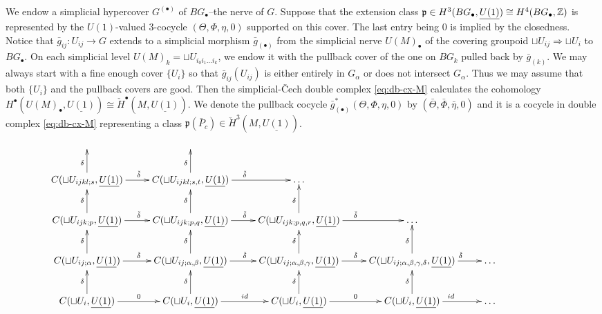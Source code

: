 \documentclass[letterpaper,10pt, oneside]{article} %
\newcommand{\frkp}{\mathfrak p}
\newcommand{\pp}{\frkp} %
\newcommand{\bg}{\bar{g}}
\newcommand{\bPhi}{\bar{\Phi}}
\newcommand{\bareta}{\bar{\eta}}
\newcommand{\bTheta}{\bar{\Theta}}
\begin{document}
We endow a simplicial hypercover $G^{(\bullet)}$ of $BG_\bullet$--the nerve of
$G$. Suppose that the extension class $\pp \in H^3(BG_\bullet, \underline{U(1)})\cong
H^4(BG_\bullet, \Z)$ is represented by  the $U(1)$-valued 3-cocycle $(\Theta,
\Phi, \eta, 0)$ supported on this cover. The last entry being $0$ is
implied by the closedness.
Notice that $\bg_{ij}: U_{ij} \to G $ extends to a simplicial morphism $\bg_{(\bullet)}$
from the simplicial nerve $U(M)_\bullet$ of the covering groupoid
$\sqcup U_{ij} \Rightarrow \sqcup U_i$ to
$BG_\bullet$. On each simplicial level $U(M)_k=\sqcup
U_{i_0 i_1\dots i_k} $, we endow it with the pullback cover of the one on
$BG_k$ pulled back by $\bg_{(k)}$. We may always start with a fine enough cover $\{U_i\}$ so that $\bar{g}_{ij}(U_{ij})$ is either entirely in $G_\alpha$ or does not intersect $G_\alpha$. Thus we may assume that both $\{U_i\}$ and the pullback covers are good. Then the
simplicial-\v{C}ech double complex \eqref{eq:db-cx-M} calculates the cohomology $H^\bullet(U(M)_\bullet, \underline{U(1)})\cong \check{H}^\bullet(M, \underline{U(1)})$. We denote the pullback cocycle $\bg_{(\bullet)}^*(\Theta, \Phi, \eta, 0)$ by
$(\bTheta, \bPhi, \bareta, 0)$ and it is a cocycle in double complex \eqref{eq:db-cx-M} representing a class $\pp(\bar{P}_c)\in \check{H}^3(M, \underline{U(1)})$.
\begin{equation}\label{eq:db-cx-M}
\xymatrix{
 &&&&&&\\
 C(\sqcup U_{ijkl;s},\underline{U(1)})\ar[r]^{\check{\delta}}\ar[u]^{\delta}
 &C(\sqcup U_{ijkl;s,t},\underline{U(1)})\ar[r]^{\check{\delta}}\ar[u]^{\delta}
 &\dots %
&%
&%
&
 \\
  C(\sqcup U_{ijk;p},\underline{U(1)})\ar[r]^{\check{\delta}}\ar[u]^{\delta}
  &C(\sqcup U_{ijk;p,q},\underline{U(1)})\ar[r]^{\check{\delta}}\ar[u]^{\delta}
 &C(\sqcup U_{ijk;p,q,r},\underline{U(1)})\ar[r]^{\check{\delta}}\ar[u]^{\delta}
&\dots %
&%
&
 \\
 C(\sqcup U_{ij;\alpha},\underline{U(1)})\ar[r]^{\check{\delta}}\ar[u]^{\delta}
 & C(\sqcup U_{ij;\alpha,\beta},\underline{U(1)})\ar[r]^{\check{\delta}}\ar[u]^{\delta}
 &C(\sqcup U_{ij;\alpha,\beta,\gamma},\underline{U(1)})\ar[r]^{\check{\delta}}\ar[u]^{\delta}
&C(\sqcup U_{ij;\alpha,\beta,\gamma,\delta},\underline{U(1)})\ar[r]^{\qquad\check{\delta}}\ar[u]^{\delta}
&\dots %
&
 \\
 C(\sqcup U_i ,\underline{U(1)})\ar[r]^{0}\ar[u]^{\delta}
 &C(\sqcup U_i, \underline{U(1)})\ar[r]^{id} \ar[u]^{\delta}
&C(\sqcup U_i, \underline{U(1)})\ar[r]^{0}\ar[u]^{\delta}
&C(\sqcup U_i , \underline{U(1)})\ar[r]^{id} \ar[u]^{\delta}
&\dots %
&
}
\end{equation}
\end{document}
